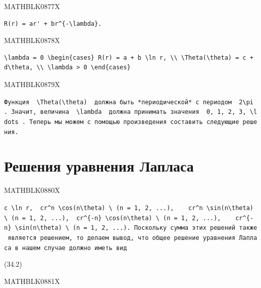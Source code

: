 \documentclass[
  ukrainian,
]{article}
\begin{document}
MATHBLK0877X

\begin{verbatim}
R(r) = ar' + br^{-\lambda}.
\end{verbatim}

MATHBLK0878X

\begin{verbatim}
\lambda = 0 \begin{cases} R(r) = a + b \ln r, \\ \Theta(\theta) = c + d\theta, \\ \lambda > 0 \end{cases}
\end{verbatim}

MATHBLK0879X

\texttt{Функция\ \ \textquotesingle{}\textbackslash{}Theta(\textbackslash{}theta)\textquotesingle{}\ \ должна\ быть\ *периодической*\ с\ периодом\ \ \textquotesingle{}2\textbackslash{}pi\textquotesingle{}\ .\ Значит,\ величина\ \ \textquotesingle{}\textbackslash{}lambda\textquotesingle{}\ \ должна\ принимать\ значения\ \ \textquotesingle{}0,\ 1,\ 2,\ 3,\ \textbackslash{}ldots\textquotesingle{}\ .\ Теперь\ мы\ можем\ с\ помощью\ произведения\ составить\ следующие\ решения.}

\section{Решения уравнения
Лапласа}\label{ux440ux435ux448ux435ux43dux438ux44f-ux443ux440ux430ux432ux43dux435ux43dux438ux44f-ux43bux430ux43fux43bux430ux441ux430-1}

MATHBLK0880X

\texttt{\textquotesingle{}c\ \textbackslash{}ln\ r,\textquotesingle{}\ \ \textquotesingle{}cr\^{}n\ \textbackslash{}cos(n\textbackslash{}theta)\ \textbackslash{}\ (n\ =\ 1,\ 2,\ ...),\textquotesingle{}\ \ \ \ \textquotesingle{}cr\^{}n\ \textbackslash{}sin(n\textbackslash{}theta)\ \textbackslash{}\ (n\ =\ 1,\ 2,\ ...),\textquotesingle{}\ \ \textquotesingle{}cr\^{}\{-n\}\ \textbackslash{}cos(n\textbackslash{}theta)\ \textbackslash{}\ (n\ =\ 1,\ 2,\ ...),\textquotesingle{}\ \ \ \ \textquotesingle{}cr\^{}\{-n\}\ \textbackslash{}sin(n\textbackslash{}theta)\ \textbackslash{}\ (n\ =\ 1,\ 2,\ ...).\textquotesingle{}\ Поскольку\ сумма\ этих\ решений\ также\ является\ решением,\ то\ делаем\ вывод,\ что\ общее\ решение\ уравнения\ Лапласа\ в\ нашем\ случае\ должно\ иметь\ вид}

(34.2)

MATHBLK0881X
\end{document}
